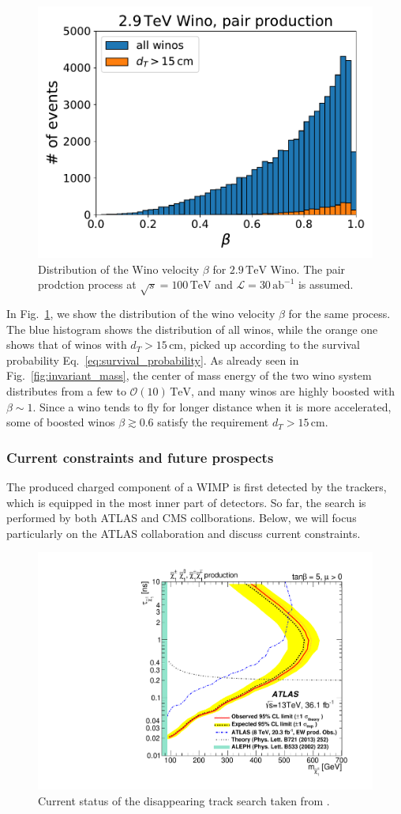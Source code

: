 \documentclass[12pt,twoside,book]{article}
\begin{document}
\begin{figure}[t]
  \centering
  \includegraphics[width=0.5\hsize]{beta.pdf}
  \caption{
    Distribution of the Wino velocity $\beta$ for $2.9\,\mathrm{TeV}$ Wino.
    The pair prodction process at $\sqrt{s}=100\,\mathrm{TeV}$ and $\mathcal{L} = 30\,\mathrm{ab}^{-1}$ is assumed.
  }
  \label{fig:beta}
\end{figure}

In Fig.~\ref{fig:beta}, we show the distribution of the wino velocity $\beta$ for the same process.
The blue histogram shows the distribution of all winos, while the orange one shows that of winos with $d_T > 15\,\mathrm{cm}$, picked up according to the survival probability Eq.~\eqref{eq:survival_probability}.
As already seen in Fig.~\ref{fig:invariant_mass}, the center of mass energy of the two wino system distributes from a few to $\mathcal{O} (10) \,\mathrm{TeV}$, and many winos are highly boosted with $\beta \sim 1$.
Since a wino tends to fly for longer distance when it is more accelerated, some of boosted winos $\beta \gtrsim 0.6$ satisfy the requirement $d_T > 15\,\mathrm{cm}$.


\subsubsection*{Current constraints and future prospects}

The produced charged component of a WIMP is first detected by the trackers, which is equipped in the most inner part of detectors.
So far, the search is performed by both ATLAS \cite{Aaboud:2017mpt} and CMS \cite{Sirunyan:2018ldc} collborations.
Below, we will focus particularly on the ATLAS collaboration and discuss current constraints.

\begin{figure}[t]
  \centering
  \includegraphics[width=0.5\hsize]{ATLAS_disappearing_track.pdf}
  \caption{Current status of the disappearing track search taken from \cite{Aaboud:2017mpt}.}
  \label{fig:ATLAS_disappearing_track}
\end{figure}
\end{document}
